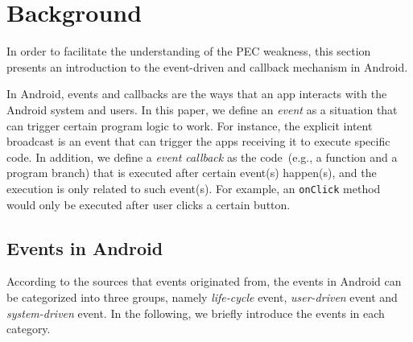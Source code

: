%
\section{Background} 
%
In order to facilitate the understanding of the PEC weakness, this section presents an introduction to the event-driven and callback mechanism in Android. 



In Android, events and callbacks are the ways that an app interacts with the Android system and users. 
In this paper, we define an \textit{event} as a situation that can trigger certain program logic to work. 
For instance, the explicit intent broadcast is an event that can trigger the apps receiving it to execute specific code.
In addition, we define a \textit{event callback} as the code~(e.g., a function and a program branch) that is executed after certain event(s) happen(s), 
and the execution is only related to such event(s). For example, an \texttt{onClick} method would only be executed after user clicks a certain button. 

\subsection{Events in Android}
According to the sources that events originated from, the events in Android can be categorized into three groups, 
namely \emph{life-cycle} event, \emph{user-driven} event and \emph{system-driven} event. 
In the following, we briefly introduce the events in each category. 

